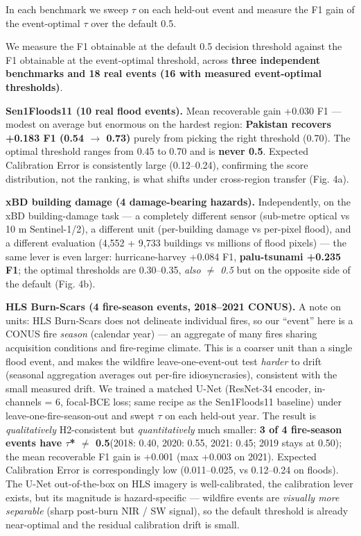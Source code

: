 In each benchmark we sweep $\tau$ on each held-out event and measure the F1
gain of the event-optimal $\tau$ over the default 0.5.

We measure the F1 obtainable at the default 0.5 decision threshold against
the F1 obtainable at the event-optimal threshold, across \textbf{three independent
benchmarks and 18 real events (16 with measured event-optimal thresholds)}.

\textbf{Sen1Floods11 (10 real flood events).} Mean recoverable gain +0.030 F1 ---
modest on average but enormous on the hardest region: \textbf{Pakistan recovers
+0.183 F1 (0.54 $\rightarrow$ 0.73)} purely from picking the right threshold (0.70).
The optimal threshold ranges from 0.45 to 0.70 and is \textbf{never 0.5}.
Expected Calibration Error is consistently large (0.12--0.24), confirming the
score distribution, not the ranking, is what shifts under cross-region
transfer (Fig. 4a).

\textbf{xBD building damage (4 damage-bearing hazards).} Independently, on the
xBD building-damage task --- a completely different sensor (sub-metre optical
vs 10 m Sentinel-1/2), a different unit (per-building damage vs per-pixel
flood), and a different evaluation (4,552 + 9,733 buildings vs millions of
flood pixels) --- the same lever is even larger: hurricane-harvey +0.084 F1,
\textbf{palu-tsunami +0.235 F1}; the optimal thresholds are 0.30--0.35, \emph{also
$\neq$ 0.5} but on the opposite side of the default (Fig. 4b).

\textbf{HLS Burn-Scars (4 fire-season events, 2018--2021 CONUS).} A note on
units: HLS Burn-Scars does not delineate individual fires, so our
``event'' here is a CONUS fire \emph{season} (calendar year) --- an aggregate of
many fires sharing acquisition conditions and fire-regime climate. This
is a coarser unit than a single flood event, and makes the wildfire
leave-one-event-out test \emph{harder} to drift (seasonal aggregation
averages out per-fire idiosyncrasies), consistent with the small
measured drift. We trained a
matched U-Net (ResNet-34 encoder, in-channels = 6, focal-BCE loss; same
recipe as the Sen1Floods11 baseline) under leave-one-fire-season-out and
swept $\tau$ on each held-out year. The result is \emph{qualitatively} H2-consistent
but \emph{quantitatively} much smaller: \textbf{3 of 4 fire-season events have
$\tau$* $\neq$ 0.5}(2018: 0.40, 2020: 0.55, 2021: 0.45; 2019 stays at 0.50);
the mean recoverable F1 gain is +0.001 (max +0.003 on 2021). Expected
Calibration Error is correspondingly low (0.011--0.025, vs 0.12--0.24 on
floods). The U-Net out-of-the-box on HLS imagery is well-calibrated, the
calibration lever exists, but its magnitude is hazard-specific --- wildfire
events are \emph{visually more separable} (sharp post-burn NIR / SW signal),
so the default threshold is already near-optimal and the residual
calibration drift is small.

